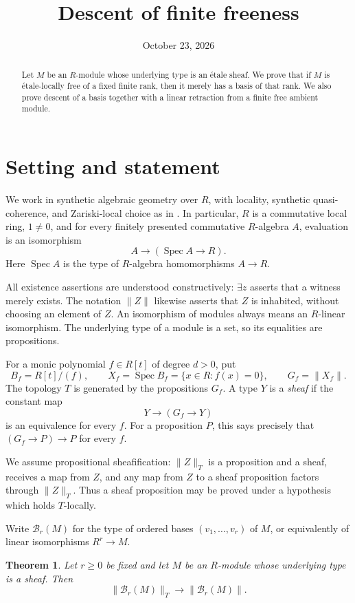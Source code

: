 \documentclass[11pt]{amsart}
\title{Descent of finite freeness}
\date{October 23, 2026}
\newtheorem{theorem}{Theorem}[section]
\theoremstyle{definition}
\newcommand{\Spec}{\operatorname{Spec}}
\newcommand{\Bas}{\mathcal B}
\newcommand{\tr}[1]{\lVert #1\rVert}
\newcommand{\loc}[1]{\lVert #1\rVert_T}
\begin{document}
\begin{abstract}
Let $M$ be an $R$-module whose underlying type is an \'etale sheaf.
We prove that if $M$ is \'etale-locally free of a fixed finite rank, then
it merely has a basis of that rank. We also prove descent of a basis
together with a linear retraction from a finite free ambient module.
\end{abstract}
\maketitle

\section{Setting and statement}

We work in synthetic algebraic geometry over $R$, with locality,
synthetic quasi-coherence, and Zariski-local choice as in \cite{SAG}.
In particular, $R$ is a commutative local ring, $1\ne0$, and for every
finitely presented commutative $R$-algebra $A$, evaluation is an isomorphism
\[
 A\longrightarrow (\Spec A\longrightarrow R).
\]
Here $\Spec A$ is the type of $R$-algebra homomorphisms $A\to R$.

All existence assertions are understood constructively: $\exists z$
asserts that a witness merely exists. The notation $\tr Z$ likewise
asserts that $Z$ is inhabited, without choosing an element of $Z$.
An isomorphism of modules always means an $R$-linear isomorphism.
The underlying type of a module is a set, so its equalities are propositions.

For a monic polynomial $f\in R[t]$ of degree $d>0$, put
\[
 B_f=R[t]/(f),\qquad X_f=\Spec B_f=\{x\in R:f(x)=0\},
 \qquad G_f=\tr{X_f}.
\]
The topology $T$ is generated by the propositions $G_f$. A type $Y$ is
a \emph{sheaf} if the constant map
\[
 Y\longrightarrow (G_f\longrightarrow Y)
\]
is an equivalence for every $f$. For a proposition $P$, this says precisely
that $(G_f\to P)\to P$ for every $f$.

We assume propositional sheafification: $\loc Z$ is a proposition and a
sheaf, receives a map from $Z$, and any map from $Z$ to a sheaf
proposition factors through $\loc Z$. Thus a sheaf proposition may be
proved under a hypothesis which holds $T$-locally.

Write $\Bas_r(M)$ for the type of ordered bases $(v_1,\ldots,v_r)$ of
$M$, or equivalently of linear isomorphisms $R^r\to M$.

\begin{theorem}\label{thm:descent}
Let $r\geq0$ be fixed and let $M$ be an $R$-module whose underlying type
is a sheaf. Then
\[
 \loc{\Bas_r(M)}\longrightarrow\tr{\Bas_r(M)}.
\]
\end{theorem}
\end{document}

